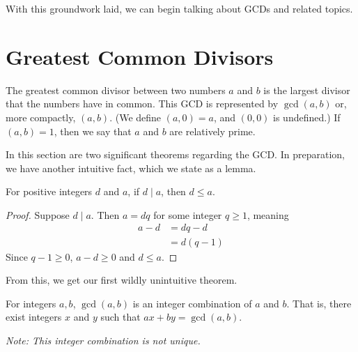 \documentclass[../m55main.tex]{chapters}
\begin{document}

With this groundwork laid, we can begin talking about GCDs and related topics.

\section{Greatest Common Divisors}
The greatest common divisor between two numbers $a$ and $b$ is the largest divisor that the numbers have in common.
This GCD is represented by $\gcd (a,b)$ or, more compactly, $(a,b)$.
(We define $(a,0) = a$, and $(0,0)$ is undefined.)
If $(a,b) = 1$, then we say that $a$ and $b$ are relatively prime.

In this section are two significant theorems regarding the GCD.
In preparation, we have another intuitive fact, which we state as a lemma.

\begin{lemma}
    For positive integers $d$ and $a$, if $d \mid a$, then $d \leq a$.
\end{lemma}

\begin{proof}
    Suppose $d \mid a$.
    Then $a = dq$ for some integer $q \geq 1$, meaning
    \begin{align*}
        a-d &= dq - d \\
        &= d (q-1)
    \end{align*}
    Since $q-1 \geq 0$, $a-d \geq 0$ and $d \leq a$.
\end{proof}

From this, we get our first wildly unintuitive theorem.

\begin{theorem}
    For integers $a,b$, $\gcd (a,b)$ is an integer combination of $a$ and $b$.
    That is, there exist integers $x$ and $y$ such that $ax + by = \gcd (a,b)$.

    \medskip
    \textit{Note: This integer combination is not unique.}
\end{theorem}
\end{document}
